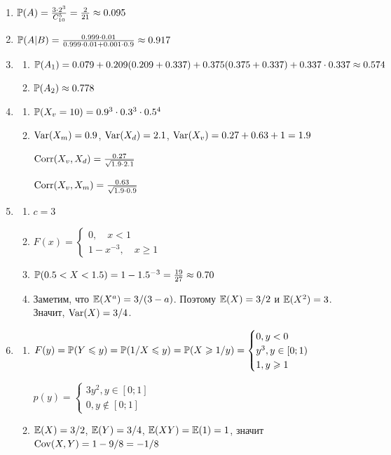 \begin{enumerate}
\item $ \P(A) = \frac{3\cdot 2^3}{C_{10}^{5}} = \frac{2}{21} \approx 0.095$
\item $ \P(A|B) = \frac{0.999\cdot 0.01}{0.999\cdot 0.01+0.001\cdot 0.9} \approx 0.917 $
\item
\begin{enumerate}
\item $\P(A_1) = 0.079 + 0.209(0.209 + 0.337) + 0.375(0.375 + 0.337) + 0.337 \cdot
0.337 \approx 0.574$
\item $\P(A_2) \approx 0.778$
\end{enumerate}
\item
\begin{enumerate}
\item $\P(X_v = 10) = 0.9^3 \cdot 0.3^3 \cdot 0.5^4$
\item $\Var(X_m) = 0.9$, $\Var(X_d) = 2.1$, $\Var(X_v) = 0.27 + 0.63 + 1 = 1.9$

$\Corr(X_v,X_d) = \frac{0.27}{\sqrt{1.9\cdot 2.1}}$

$\Corr(X_v,X_m) = \frac{0.63}{\sqrt{1.9\cdot 0.9}}$
\end{enumerate}
\item
\begin{enumerate}
\item $c = 3$
\item $ F(x) =
\begin{cases}
0, \quad x<1 \\
1-x^{-3}, \quad x\geq 1
\end{cases} $
\item $\P(0.5 < X < 1.5) = 1 - 1.5^{-3} = \frac{19}{27} \approx 0.70$
\item Заметим, что $\E(X^a) = 3/(3-a)$. Поэтому $\E(X) = 3/2$ и $\E(X^2) = 3$.
Значит, $\Var(X) = 3/4$.
\end{enumerate}
\item
\begin{enumerate}
\item $ F(y) = \P(Y \leq y) = \P(1/X \leq y) = \P(X \geq 1/y) =
\begin{cases}
0, y < 0 \\
y^3, y \in [0;1) \\
1, y \geq 1
\end{cases}$

$p(y)=
\begin{cases}
3y^2, y \in [0;1] \\
0, y \notin [0;1]
\end{cases}$
\item $\E(X) = 3/2$, $\E(Y) = 3/4$, $\E(XY) = \E(1) = 1$, значит $\Cov(X,Y) = 1 - 9/8 = -1/8$


\end{enumerate}
\end{enumerate}
